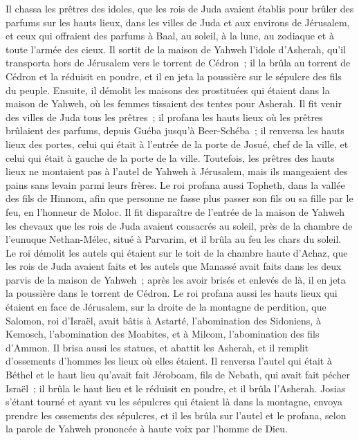 \begin{multicols}{2}
Il chassa les prêtres des idoles, que les rois de Juda avaient établis pour brûler des parfums sur les hauts lieux, dans les villes de Juda et aux environs de Jérusalem, et ceux qui offraient des parfums à Baal, au soleil, à la lune, au zodiaque et à toute l'armée des cieux.
Il sortit de la maison de Yahweh l'idole d'Asherah, qu'il transporta hors de Jérusalem vers le torrent de Cédron~; il la brûla au torrent de Cédron et la réduisit en poudre, et il en jeta la poussière sur le sépulcre des fils du peuple.
Ensuite, il démolit les maisons des prostituées qui étaient dans la maison de Yahweh, où les femmes tissaient des tentes pour Asherah.
Il fit venir des villes de Juda tous les prêtres~; il profana les hauts lieux où les prêtres brûlaient des parfums, depuis Guéba jusqu'à Beer-Schéba~; il renversa les hauts lieux des portes, celui qui était à l'entrée de la porte de Josué, chef de la ville, et celui qui était à gauche de la porte de la ville.
Toutefois, les prêtres des hauts lieux ne montaient pas à l'autel de Yahweh à Jérusalem, mais ils mangeaient des pains sans levain parmi leurs frères.
Le roi profana aussi Topheth, dans la vallée des fils de Hinnom, afin que personne ne fasse plus passer son fils ou sa fille par le feu, en l'honneur de Moloc.
Il fit disparaître de l'entrée de la maison de Yahweh les chevaux que les rois de Juda avaient consacrés au soleil, près de la chambre de l'eunuque Nethan-Mélec, situé à Parvarim, et il brûla au feu les chars du soleil.
Le roi démolit les autels qui étaient sur le toit de la chambre haute d'Achaz, que les rois de Juda avaient faits et les autels que Manassé avait faits dans les deux parvis de la maison de Yahweh~; après les avoir brisés et enlevés de là, il en jeta la poussière dans le torrent de Cédron.
Le roi profana aussi les hauts lieux qui étaient en face de Jérusalem, sur la droite de la montagne de perdition, que Salomon, roi d'Israël, avait bâtis à Astarté, l'abomination des Sidoniens, à Kemosch, l'abomination des Moabites, et à Milcom, l'abomination des fils d'Ammon.
Il brisa aussi les statues, et abattit les Asherah, et il remplit d'ossements d'hommes les lieux où elles étaient.
Il renversa l'autel qui était à Béthel et le haut lieu qu'avait fait Jéroboam, fils de Nebath, qui avait fait pécher Israël~; il brûla le haut lieu et le réduisit en poudre, et il brûla l'Asherah.
Josias s'étant tourné et ayant vu les sépulcres qui étaient là dans la montagne, envoya prendre les ossements des sépulcres, et il les brûla sur l'autel et le profana, selon la parole de Yahweh prononcée à haute voix par l'homme de Dieu.

\end{multicols}
